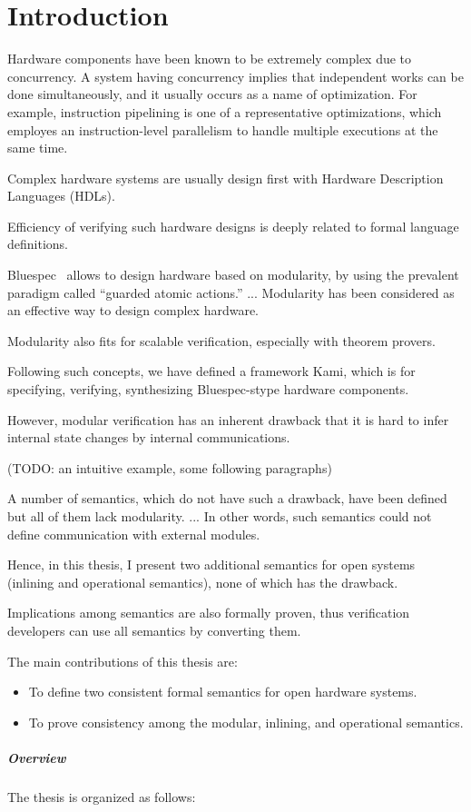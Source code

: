\chapter{Introduction}

Hardware components have been known to be extremely complex due to
concurrency. A system having concurrency implies that independent
works can be done simultaneously, and it usually occurs as a name of
optimization. For example, instruction pipelining is one of a
representative optimizations, which employes an instruction-level
parallelism to handle multiple executions at the same time.

Complex hardware systems are usually design first with Hardware
Description Languages (HDLs).

Efficiency of verifying such hardware designs is deeply related to
formal language definitions.

Bluespec~\cite{bsdef, bsref} allows to design hardware based on
modularity, by using the prevalent paradigm called ``guarded atomic
actions.'' ... Modularity has been considered as an effective way to
design complex hardware.

Modularity also fits for scalable verification, especially with
theorem provers.

Following such concepts, we have defined a framework Kami, which is
for specifying, verifying, synthesizing Bluespec-stype hardware
components.

However, modular verification has an inherent drawback that it is hard
to infer internal state changes by internal communications.

(TODO: an intuitive example, some following paragraphs)

A number of semantics, which do not have such a drawback, have been
defined but all of them lack modularity. ... In other words, such
semantics could not define communication with external modules.

Hence, in this thesis, I present two additional semantics for open
systems (inlining and operational semantics), none of which has the
drawback.

Implications among semantics are also formally proven, thus
verification developers can use all semantics by converting them.

The main contributions of this thesis are:
\begin{itemize}
\item To define two consistent formal semantics for open hardware
  systems.
\item To prove consistency among the modular, inlining, and
  operational semantics.
\end{itemize}

\paragraph{Overview} The thesis is organized as follows:





